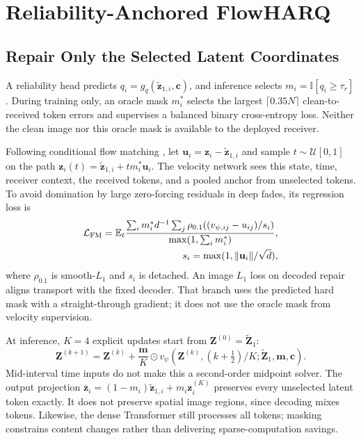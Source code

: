 \documentclass[conference]{IEEEtran}
\begin{document}
\section{Reliability-Anchored FlowHARQ}
\subsection{Repair Only the Selected Latent Coordinates}
A reliability head predicts $q_i=g_q(\widetilde{\mathbf z}_{1,i},\mathbf c)$,
and inference selects $m_i=\mathbb I[q_i\geq\tau_r]$. During training only,
an oracle mask $m_i^*$ selects the largest $\lceil0.35N\rceil$ clean-to-received
token errors and supervises a balanced binary cross-entropy loss. Neither the
clean image nor this oracle mask is available to the deployed receiver.

Following conditional flow matching \cite{flowmatching}, let
$\mathbf u_i=\mathbf z_i-\widetilde{\mathbf z}_{1,i}$ and sample
$t\sim\mathcal U[0,1]$ on the path
$\mathbf z_i(t)=\widetilde{\mathbf z}_{1,i}+tm_i^*\mathbf u_i$.
The velocity network sees this state, time, receiver context, the received
tokens, and a pooled anchor from unselected tokens. To avoid domination by
large zero-forcing residuals in deep fades, its regression loss is
\begin{align}
 \mathcal L_{\rm FM}=\mathbb E_t
 \frac{\sum_i m_i^*d^{-1}\sum_j
 \rho_{0.1}((v_{\psi,ij}-u_{ij})/s_i)}{\max(1,\sum_i m_i^*)},\nonumber\\
 s_i=\max(1,\|\mathbf u_i\|/\sqrt d),
 \label{eq:fm}
\end{align}
where $\rho_{0.1}$ is smooth-$L_1$ and $s_i$ is detached. An image $L_1$
loss on decoded repair aligns transport with the fixed decoder. That branch
uses the predicted hard mask with a straight-through gradient; it does not
use the oracle mask from velocity supervision.

At inference, $K=4$ explicit updates start from
$\mathbf Z^{(0)}=\widetilde{\mathbf Z}_1$:
\begin{equation}
 \mathbf Z^{(k+1)}=\mathbf Z^{(k)}+
 \frac{\mathbf m}{K}\odot
 v_\psi(\mathbf Z^{(k)},(k+\tfrac12)/K;
       \widetilde{\mathbf Z}_1,\mathbf m,\mathbf c).
 \label{eq:flow}
\end{equation}
Mid-interval time inputs do not make this a second-order midpoint solver.
The output projection
$\bar{\mathbf z}_i=(1-m_i)\widetilde{\mathbf z}_{1,i}+m_i\mathbf z_i^{(K)}$
preserves every unselected latent token exactly. It does not preserve spatial
image regions, since decoding mixes tokens. Likewise, the dense Transformer
still processes all tokens; masking constrains content changes rather than
delivering sparse-computation savings.
\end{document}
